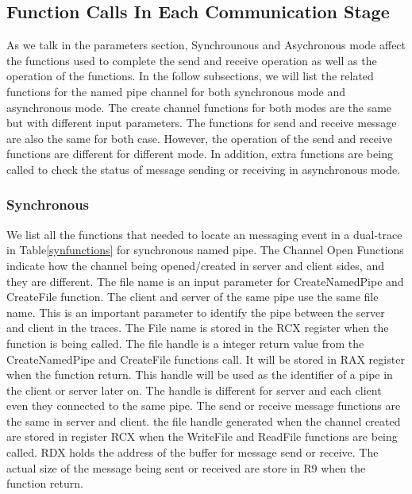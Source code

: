 \subsection{Function Calls In Each Communication Stage}
As we talk in the parameters section, Synchrounous and Asychronous mode affect the functions used to complete the send and receive operation as well as the operation of the functions. In the follow subsections, we will list the related functions for the named pipe channel for both synchronous mode and asynchronous mode. The create channel functions for both modes are the same but with different input parameters. The functions for send and receive message are also the same for both case. However, the operation of the send and receive functions are different for different mode. In addition, extra functions are being called to check the status of message sending or receiving in asynchronous mode.
\subsubsection{Synchronous}
We list all the functions that needed to locate an messaging event in a dual-trace in Table\ref{synfunctions} for synchronous named pipe. The Channel Open Functions indicate how the channel being opened/created in server and client sides, and they are different. The file name is an input parameter for CreateNamedPipe and CreateFile function. The client and server of the same pipe use the same file name. This is an important parameter to identify the pipe between the server and client in the traces. The File name is stored in the RCX register when the function is being called. The file handle is a integer return value from the CreateNamedPipe and CreateFile functions call. It will be stored in RAX register when the function return. This handle will be used as the identifier of a pipe in the client or server later on. The handle is different for server and each client even they connected to the same pipe. The send or receive message functions are the same in server and client. the file handle generated when the channel created are stored in register RCX when the WriteFile and ReadFile functions are being called. RDX holds the address of the buffer for message send or receive. The actual size of the message being sent or received are store in R9 when the function return.
  

